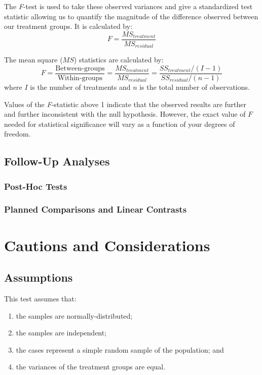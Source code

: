 The \textit{F}-test is used to take these observed variances and give a standardized test statistic allowing us to quantify the magnitude of the difference observed between our treatment groups. It is calculated by:
\begin{equation}
F = \frac{MS_{treatment}}{MS_{residual}}
\end{equation}

The mean square ($MS$) statistics are calculated by:
\begin{equation*}
F = \frac{\text{Between-groups}}{\text{Within-groups}} = \frac{MS_{treatment}}{MS_{residual}} = \frac{SS_{treatment}/(I-1)}{SS_{residual}/(n-1)}
\end{equation*}
where $I$ is the number of treatments and $n$ is the total number of observations.

Values of the \textit{F}-statistic above 1 indicate that the observed results are further and further inconsistent with the null hypothesis. However, the exact value of $F$ needed for statistical significance will vary as a function of your degrees of freedom.

\subsection{Follow-Up Analyses}

\subsubsection{Post-Hoc Tests}

\subsubsection{Planned Comparisons and Linear Contrasts}

\section{Cautions and Considerations}

\subsection{Assumptions}

This test assumes that:

\begin{enumerate}
\item the samples are normally-distributed;
\item the samples are independent;
\item the cases represent a simple random sample of the population; and
\item the variances of the treatment groups are equal.
\end{enumerate}

